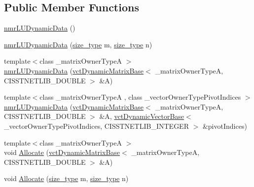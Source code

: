 \subsection*{Public Member Functions}
\begin{DoxyCompactItemize}
\item 
\hyperlink{classnmr_l_u_dynamic_data_a55c6a2b66f2b135e11c314f64833d26e}{nmr\-L\-U\-Dynamic\-Data} ()
\item 
\hyperlink{classnmr_l_u_dynamic_data_a05053cf47ae4af807c1c5171ecf2563a}{nmr\-L\-U\-Dynamic\-Data} (\hyperlink{classnmr_l_u_dynamic_data_a63259a289f8f94498b5102ce39722bbe}{size\-\_\-type} m, \hyperlink{classnmr_l_u_dynamic_data_a63259a289f8f94498b5102ce39722bbe}{size\-\_\-type} n)
\item 
{\footnotesize template$<$class \-\_\-matrix\-Owner\-Type\-A $>$ }\\\hyperlink{classnmr_l_u_dynamic_data_a03630a93e229576e73da3f9a959d4d12}{nmr\-L\-U\-Dynamic\-Data} (\hyperlink{classvct_dynamic_matrix_base}{vct\-Dynamic\-Matrix\-Base}$<$ \-\_\-matrix\-Owner\-Type\-A, C\-I\-S\-S\-T\-N\-E\-T\-L\-I\-B\-\_\-\-D\-O\-U\-B\-L\-E $>$ \&A)
\item 
{\footnotesize template$<$class \-\_\-matrix\-Owner\-Type\-A , class \-\_\-vector\-Owner\-Type\-Pivot\-Indices $>$ }\\\hyperlink{classnmr_l_u_dynamic_data_a2af25399a0b3ca245b54c956e8e96d87}{nmr\-L\-U\-Dynamic\-Data} (\hyperlink{classvct_dynamic_matrix_base}{vct\-Dynamic\-Matrix\-Base}$<$ \-\_\-matrix\-Owner\-Type\-A, C\-I\-S\-S\-T\-N\-E\-T\-L\-I\-B\-\_\-\-D\-O\-U\-B\-L\-E $>$ \&A, \hyperlink{classvct_dynamic_vector_base}{vct\-Dynamic\-Vector\-Base}$<$ \-\_\-vector\-Owner\-Type\-Pivot\-Indices, C\-I\-S\-S\-T\-N\-E\-T\-L\-I\-B\-\_\-\-I\-N\-T\-E\-G\-E\-R $>$ \&pivot\-Indices)
\item 
{\footnotesize template$<$class \-\_\-matrix\-Owner\-Type\-A $>$ }\\void \hyperlink{classnmr_l_u_dynamic_data_ad585ff877ac1bb95fb585c48f1a84f9b}{Allocate} (\hyperlink{classvct_dynamic_matrix_base}{vct\-Dynamic\-Matrix\-Base}$<$ \-\_\-matrix\-Owner\-Type\-A, C\-I\-S\-S\-T\-N\-E\-T\-L\-I\-B\-\_\-\-D\-O\-U\-B\-L\-E $>$ \&A)
\item 
void \hyperlink{classnmr_l_u_dynamic_data_aae8d1c2565653772a475222615cae23b}{Allocate} (\hyperlink{classnmr_l_u_dynamic_data_a63259a289f8f94498b5102ce39722bbe}{size\-\_\-type} m, \hyperlink{classnmr_l_u_dynamic_data_a63259a289f8f94498b5102ce39722bbe}{size\-\_\-type} n)
\item 

\end{DoxyCompactItemize}
